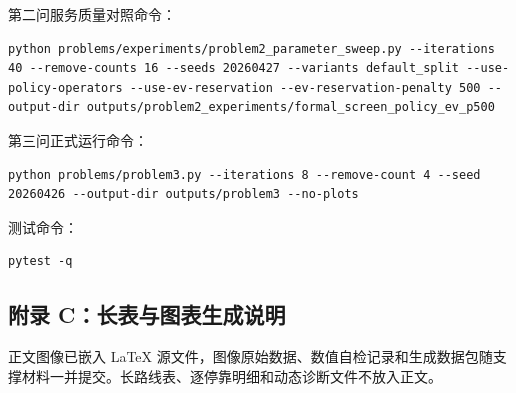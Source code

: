 \documentclass[UTF8,zihao=-4,a4paper]{ctexart}
\begin{document}
第二问服务质量对照命令：

\begin{lstlisting}[basicstyle=\ttfamily\small,breaklines=true]
python problems/experiments/problem2_parameter_sweep.py --iterations 40 --remove-counts 16 --seeds 20260427 --variants default_split --use-policy-operators --use-ev-reservation --ev-reservation-penalty 500 --output-dir outputs/problem2_experiments/formal_screen_policy_ev_p500
\end{lstlisting}

第三问正式运行命令：

\begin{lstlisting}[basicstyle=\ttfamily\small,breaklines=true]
python problems/problem3.py --iterations 8 --remove-count 4 --seed 20260426 --output-dir outputs/problem3 --no-plots
\end{lstlisting}

测试命令：

\begin{lstlisting}[basicstyle=\ttfamily\small,breaklines=true]
pytest -q
\end{lstlisting}

\subsection{附录 C：长表与图表生成说明}
正文图像已嵌入 LaTeX 源文件，图像原始数据、数值自检记录和生成数据包随支撑材料一并提交。长路线表、逐停靠明细和动态诊断文件不放入正文。
\end{document}

